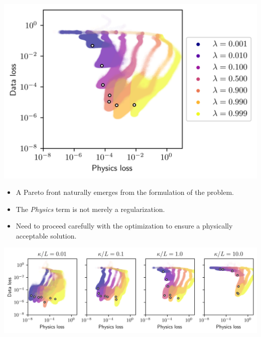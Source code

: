 \documentclass[aspectratio=169,compress,12pt,dvipsnames]{beamer}
\begin{document}
\begin{frame}
  \vfill
  \begin{minipage}{.38\textwidth}
    \centering
    \includegraphics[width=\textwidth]{pareto_front.png}
  \end{minipage}%
  \hfill
  \begin{minipage}{.58\textwidth}
    \begin{itemize}
      \item A Pareto front naturally emerges from the formulation of the problem.
        \par
      \item The \emph{Physics} term is not merely a regularization.
        \par
      \item Need to proceed carefully with the optimization to ensure a physically acceptable solution.
    \end{itemize}
  \end{minipage}
  \vfill
\end{frame}

\begin{frame}
  \vfill
  \centering
  \includegraphics[width=.9\textwidth]{complete_pareto_fronts.png}
  \vfill
\end{frame}
\end{document}

